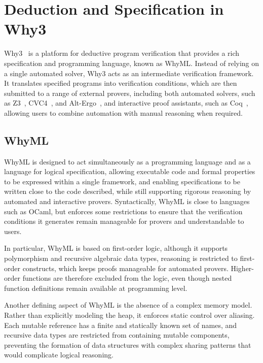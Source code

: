 \section{Deduction and Specification in Why3}
\label{sec:deduction}

Why3~\cite{why3} is a platform for deductive program verification that provides a rich specification and programming language, known as WhyML. Instead of relying on a single automated solver, Why3 acts as an intermediate verification framework. It translates specified programs into verification conditions, which are then submitted to a range of external provers, including both automated solvers, such as Z3~\cite{z3}, CVC4~\cite{cvc}, and Alt-Ergo~\cite{alt-ergo}, and interactive proof assistants, such as Coq~\cite{coq}, allowing users to combine automation with manual reasoning when required.

\subsection{WhyML}
\label{sub:whyml}

WhyML is designed to act simultaneously as a programming language and as a language for logical specification, allowing executable code and formal properties to be expressed within a single framework, and enabling specifications to be written close to the code described, while still supporting rigorous reasoning by automated and interactive provers. Syntactically, WhyML is close to languages such as OCaml, but enforces some restrictions to ensure that the verification conditions it generates remain manageable for provers and understandable to users.

In particular, WhyML is based on first-order logic, although it supports polymorphism and recursive algebraic data types, reasoning is restricted to first-order constructs, which keeps proofs manageable for automated provers. Higher-order functions are therefore excluded from the logic, even though nested function definitions remain available at programming level.

Another defining aspect of WhyML is the absence of a complex memory model. Rather than explicitly modeling the heap, it enforces static control over aliasing. Each mutable reference has a finite and statically known set of names, and recursive data types are restricted from containing mutable components, preventing the formation of data structures with complex sharing patterns that would complicate logical reasoning.

